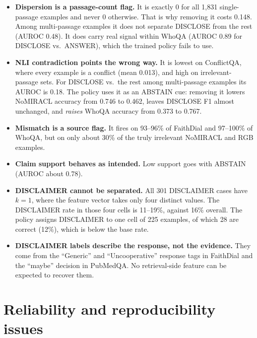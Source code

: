 \documentclass[10pt,a4paper]{article}
\begin{document}
\begin{itemize}
\item \textbf{Dispersion is a passage-count flag.} It is exactly 0 for all 1{,}831 single-passage
  examples and never 0 otherwise. That is why removing it costs 0.148. Among multi-passage
  examples it does not separate DISCLOSE from the rest (AUROC 0.48). It does carry real signal
  within WhoQA (AUROC 0.89 for DISCLOSE vs.\ ANSWER), which the trained policy fails to use.
\item \textbf{NLI contradiction points the wrong way.} It is lowest on ConflictQA, where every
  example is a conflict (mean 0.013), and high on irrelevant-passage sets. For DISCLOSE vs.\ the
  rest among multi-passage examples its AUROC is 0.18. The policy uses it as an ABSTAIN cue:
  removing it lowers NoMIRACL accuracy from 0.746 to 0.462, leaves DISCLOSE F1 almost unchanged,
  and \emph{raises} WhoQA accuracy from 0.373 to 0.767.
\item \textbf{Mismatch is a source flag.} It fires on 93--96\% of FaithDial and 97--100\% of WhoQA,
  but on only about 30\% of the truly irrelevant NoMIRACL and RGB examples.
\item \textbf{Claim support behaves as intended.} Low support goes with ABSTAIN (AUROC about 0.78).
\item \textbf{DISCLAIMER cannot be separated.} All 301 DISCLAIMER cases have $k{=}1$, where the
  feature vector takes only four distinct values. The DISCLAIMER rate in those four cells is
  11--19\%, against 16\% overall. The policy assigns DISCLAIMER to one cell of 225 examples, of
  which 28 are correct (12\%), which is below the base rate.
\item \textbf{DISCLAIMER labels describe the response, not the evidence.} They come from the
  ``Generic'' and ``Uncooperative'' response tags in FaithDial and the ``maybe'' decision in
  PubMedQA. No retrieval-side feature can be expected to recover them.
\end{itemize}

\section{Reliability and reproducibility issues}
\end{document}
